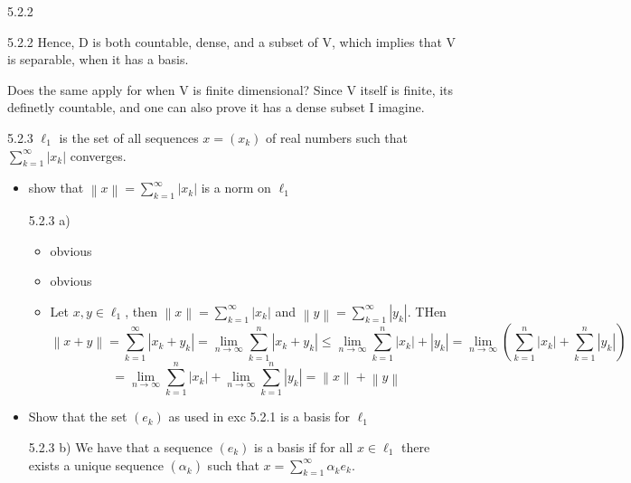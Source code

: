 \documentclass[a4paper,norsk]{article}
\renewcommand{\leq}{\leqslant}
\begin{document}
\begin{oppgavebox}{5.2.2}{}
\begin{proofbox}{5.2.2}{}
  Hence, D is both countable, dense, and a subset of V, which implies that V is separable, when it has a basis.
  
\end{proofbox}
\end{oppgavebox}


Does the same apply for when V is finite dimensional? Since V itself is finite, its definetly countable, and one can also prove it has a dense subset I imagine.


\begin{oppgavebox}{5.2.3}{}
$ \ell_1 $ is the set of all sequences $ x = \left( x_k \right)  $ of real numbers such that $ \sum_{k=1}^{\infty} \left| x_k \right|    $ converges. 
\begin{itemize}
  \item[a)] show that $ \left\lVert x \right\rVert = \sum_{k=1}^{\infty} \left| x_k \right|    $ is a norm on $ \ell_1 $ 
  \begin{proofbox}{5.2.3 a)}{}
    \begin{itemize}
      \item[i)] obvious
      \item[ii)] obvious
      \item[iii)] Let $ x, y \in \ell_1 $, then $ \left\lVert x \right\rVert   = \sum_{k=1}^{\infty} \left| x_k \right|   $ and $ \left\lVert y \right\rVert = \sum_{k=1}^{\infty} \left| y_k \right|   $. THen 
      \[
          \left\lVert x+y \right\rVert = \sum_{k=1}^{\infty} \left| x_k + y_k \right| = \lim_{n \to \infty} \sum_{k=1}^{n} \left| x_k + y_k \right| \leq \lim_{n \to \infty}   \sum_{k=1}^{n} \left| x_k \right| + \left| y_k \right|   = \lim_{n \to \infty} \left( \sum_{k=1}^{n} \left| x_k \right| + \sum_{k=1}^{n} \left| y_k \right|    \right)
      \]
      \[
          = \lim_{n \to \infty} \sum_{k=1}^{n} \left| x_k \right|   + \lim_{n \to \infty} \sum_{k=1}^{n} \left| y_k \right|  = \left\lVert x \right\rVert + \left\lVert y \right\rVert 
      \]
    \end{itemize}
  \end{proofbox}
  \item[b)] Show that the set $ \left( e_k \right)  $ as used in exc 5.2.1 is a basis for $ \ell_1 $  
  
  \begin{proofbox}{5.2.3 b)}{}
    We have that a sequence $ \left( e_k \right)  $ is a basis if for all $ x \in  \ell_1 $ there exists a unique sequence $ \left( \alpha_{k}^{}  \right)  $ such that $ x = \sum_{k=1}^{\infty} \alpha_{k}^{} e_k   $. 


\end{proofbox}
\end{itemize}
\end{oppgavebox}
\end{document}
